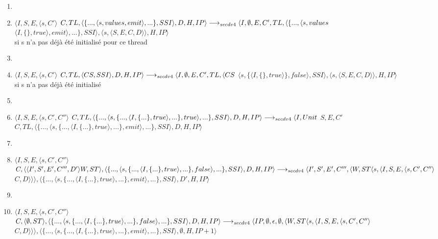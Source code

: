 \documentclass[10pt,a4paper]{article}
\begin{document}
\begin{enumerate}
				\item[]	
				\item $\langle I,S,E,\langle s,C'\rangle$ $C,TL,\langle \{...,\langle s,values,emit\rangle,...\},SSI\rangle,D,H,IP\rangle 
				\\\longrightarrow_{secdv4} \langle I,\emptyset,E,C',TL,\langle \{...,\langle s,values$ $\langle I,\{\},true\rangle,emit\rangle,...\},SSI\rangle,\langle s,\langle S,E,C,D\rangle\rangle,H,IP\rangle$\\ si s n'a pas déjà été initialisé pour ce thread
				\item[]	
				\item $\langle I,S,E,\langle s,C'\rangle$ $C,TL,\langle CS,SSI\rangle,D,H,IP\rangle 
				\\\longrightarrow_{secdv4} \langle I,\emptyset,E,C',TL,\langle CS$ $\langle s,\{\langle I,\{\},true\rangle\},false\rangle,SSI\rangle,\langle s,\langle S,E,C,D\rangle\rangle,H,IP\rangle$\\ si s n'a pas déjà été initialisé
				\item[]	
				\item $\langle I,S,E,\langle s,C',C''\rangle$ $C,TL,\langle \{...,\langle s,\{...,\langle I,\{...\},true\rangle,...\},true\rangle,...\},SSI\rangle,D,H,IP\rangle 
				\\\longrightarrow_{secdv4} \langle I,Unit$ $S,E,C'$ $C,TL,\langle \{...,\langle s,\{...,\langle I,\{...\},true\rangle,...\},emit\rangle,...\},SSI\rangle,D,H,IP\rangle$ 
				\item[]
				\item $\langle I,S,E,\langle s,C',C''\rangle$ $C,\langle\langle I',S',E',C''',D'\rangle W,ST\rangle,\langle \{...,\langle s,\{...,\langle I,\{...\},true\rangle,...\},false\rangle,...\},SSI\rangle,D,H,IP\rangle 
				\\\longrightarrow_{secdv4} \langle I',S',E',C''',\langle W,ST\langle s,\langle I,S,E,\langle s,C',C''\rangle$ $C,D\rangle\rangle\rangle,\langle \{...,\langle s,\{...,\langle I,\{...\},true\rangle,...\},emit\rangle,...\},SSI\rangle,D',H,IP\rangle$ 
				\item[]	
				\item $\langle I,S,E,\langle s,C',C''\rangle$ $C,\langle \emptyset,ST\rangle,\langle \{...,\langle s,\{...,\langle I,\{...\},true\rangle,...\},false\rangle,...\},SSI\rangle,D,H,IP\rangle 
				\\\longrightarrow_{secdv4} \langle IP,\emptyset,\epsilon,\emptyset,\langle W,ST\langle s,\langle I,S,E,\langle s,C',C''\rangle$ $C,D\rangle\rangle\rangle,\langle \{...,\langle s,\{...,\langle I,\{...\},true\rangle,...\},emit\rangle,...\},SSI\rangle,\emptyset,H,IP+1\rangle$ 

\end{enumerate}
\end{document}
